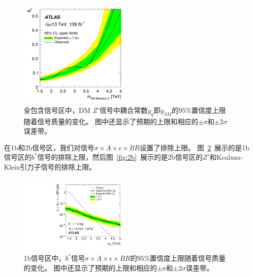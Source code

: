 \begin{figure}[tbp]
\centering
\includegraphics[width=0.49\textwidth]{figs/fig_05.pdf}
\caption{
 全包含信号区中，DM $Z'$信号中耦合常数$g_q$即$g_{SM}$的$95\%$置信度上限随着信号质量的变化。
 图中还显示了预期的上限和相应的$\pm \sigma$和$\pm 2\sigma$误差带。
}
\label{fig:zprime}
\end{figure}


在1b和2b信号区，我们对信号$\sigma\times A \times \epsilon \times BR$设置了排除上限。
图~\ref{fig:1b}~展示的是1b信号区的$b^*$信号的排除上限，然后图~\ref{fig:2b}~展示的是2b信号区的$Z'$和Kealuza-Klein引力子信号的排除上限。


\begin{figure}[tbp]
\centering
\includegraphics[width=0.49\textwidth]{figs/fig_06.pdf}
\caption{
  1b信号区中，$b^*$信号$\sigma\times A \times \epsilon \times BR$的$95\%$置信度上限随着信号质量的变化。
  图中还显示了预期的上限和相应的$\pm \sigma$和$\pm 2\sigma$误差带。
}
\label{fig:1b}
\end{figure}

